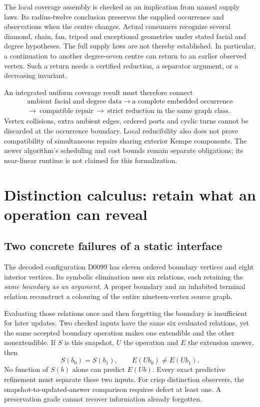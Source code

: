 The local coverage assembly is checked as an implication from named supply
laws. Its radius-twelve conclusion preserves the supplied occurrence and
observations when the centre changes. Actual consumers recognize several
diamond, chain, fan, tripod and exceptional geometries under stated facial
and degree hypotheses. The full supply laws are not thereby established.
In particular, a continuation to another degree-seven centre can return
to an earlier observed vertex. Such a return needs a certified reduction,
a separator argument, or a decreasing invariant.

An integrated uniform coverage result must therefore connect
\[
\begin{gathered}
\text{ambient facial and degree data}
\ \longrightarrow\ \text{a complete embedded occurrence}\\
\longrightarrow\ \text{compatible repair}
\ \longrightarrow\ \text{strict reduction in the same graph class}.
\end{gathered}
\]
Vertex collisions, extra ambient edges, ordered ports and cyclic turns
cannot be discarded at the occurrence boundary. Local reducibility also
does not prove compatibility of simultaneous repairs sharing exterior
Kempe components. The newer algorithm's scheduling and cost bounds remain
separate obligations; its near-linear runtime is not claimed for this
formalization.

\section{Distinction calculus: retain what an operation can reveal}
\label{sec:current-distinctions}

\subsection{Two concrete failures of a static interface}

The decoded configuration D0099 has eleven ordered boundary vertices and
eight interior vertices. Its symbolic elimination uses six relations,
each retaining the \emph{same boundary as an argument}. A proper boundary
and an inhabited terminal relation reconstruct a colouring of the entire
nineteen-vertex source graph.

Evaluating those relations once and then forgetting the boundary is
insufficient for later updates. Two checked inputs have the same six
evaluated relations, yet the same accepted boundary operation makes one
extendible and the other nonextendible. If $S$ is this snapshot, $U$ the
operation and $E$ the extension answer, then
\[
 S(b_0)=S(b_1),\qquad E(Ub_0)\ne E(Ub_1).
\]
No function of $S(b)$ alone can predict $E(Ub)$. Every exact predictive
refinement must separate these two inputs. For crisp distinction observers,
the snapshot-to-updated-answer comparison requires defect at least one.
A preservation grade cannot recover information already forgotten.

